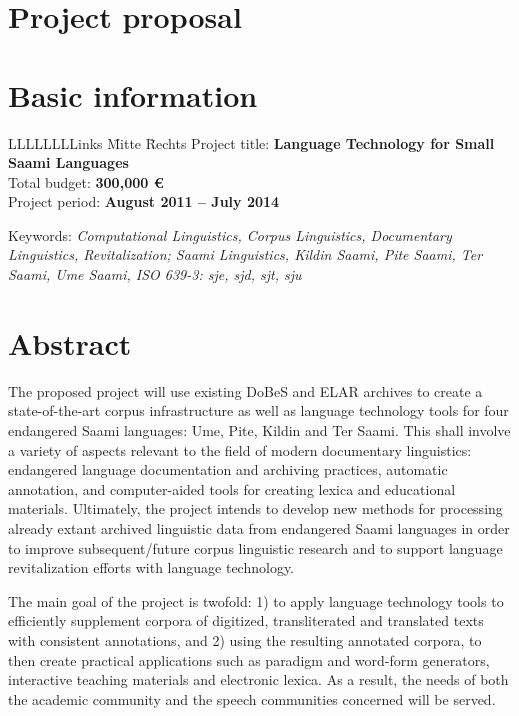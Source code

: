 \documentclass[a4paper,12pt]{article}
\begin{document}
\newpage

\section*{Project proposal}

\section{Basic information}

\begin{tabbing}
LLLLLLLLinks \= Mitte \= Rechts \kill
Project title: \>\textbf{Language Technology for Small Saami Languages}\\
Total budget: \>\textbf{300,000 €}\\
Project period: \>\textbf{August 2011 – July 2014}\\
\end{tabbing}
Keywords: {\it Computational Linguistics, Corpus Linguistics, Documentary Linguistics, Revitalization; Saami Linguistics, Kildin Saami, Pite Saami, Ter Saami, Ume Saami, ISO 639-3: sje, sjd, sjt, sju}

\section{Abstract}%
The proposed project will use existing DoBeS and ELAR archives to create a state-of-the-art corpus infrastructure as well as language technology tools for four endangered Saami languages: Ume, Pite, Kildin and Ter Saami. This shall involve a variety of aspects relevant to the field of modern documentary linguistics: endangered language documentation and archiving practices, automatic annotation, and computer-aided tools for creating lexica and educational materials. Ultimately, the project intends to develop new methods for processing already extant archived linguistic data from endangered Saami languages in order to improve subsequent/future corpus linguistic research and to support language revitalization efforts with language technology.

The main goal of the project is twofold: 1) to apply language technology tools to efficiently supplement corpora of digitized, transliterated and translated texts with consistent annotations, and 2) using the resulting annotated corpora, to then create practical applications such as paradigm and word-form generators, interactive teaching materials and electronic lexica. As a result, the needs of both the academic community and the speech communities concerned will be served.
\end{document}
